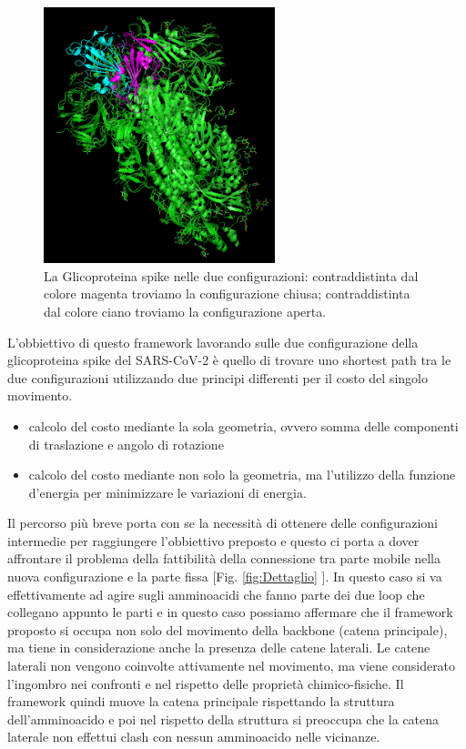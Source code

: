 \begin{figure}
	\centering
	\includegraphics[width=0.6\textwidth]{Immagini/Struttura_aperta_chiusa.png}
	\caption{La Glicoproteina spike nelle due configurazioni: contraddistinta dal colore magenta troviamo la configurazione chiusa; contraddistinta dal colore ciano troviamo la configurazione aperta.}
	\label{fig:Configurazioni}
\end{figure}

L'obbiettivo di questo framework lavorando sulle due configurazione della glicoproteina spike del SARS-CoV-2 è quello di trovare uno shortest path tra le due configurazioni utilizzando due principi differenti per il costo del singolo movimento.
\vspace{10pt}
\begin{itemize}
	\item calcolo del costo mediante la sola geometria, ovvero somma delle componenti di traslazione e angolo di rotazione 
	\vspace{5pt}
	\item calcolo del costo mediante non solo la geometria, ma l'utilizzo della funzione d'energia per minimizzare le variazioni di energia. 
\end{itemize}

Il percorso più breve porta con se la necessità di ottenere delle configurazioni intermedie per raggiungere l'obbiettivo preposto e questo ci porta a dover affrontare il problema della fattibilità della connessione tra parte mobile nella nuova configurazione e la parte fissa [Fig. \ref{fig:Dettaglio} ]. In questo caso si va effettivamente ad agire sugli amminoacidi che fanno parte dei due loop che collegano appunto le parti e in questo caso possiamo affermare che il framework proposto si occupa non solo del movimento della backbone (catena principale), ma tiene in considerazione anche la presenza delle catene laterali. Le catene laterali non vengono coinvolte attivamente nel movimento, ma viene considerato l'ingombro nei confronti e nel rispetto delle proprietà chimico-fisiche. Il framework quindi muove la catena principale rispettando la struttura dell'amminoacido e poi nel rispetto della struttura si preoccupa che la catena laterale non effettui clash con nessun amminoacido nelle vicinanze. 

